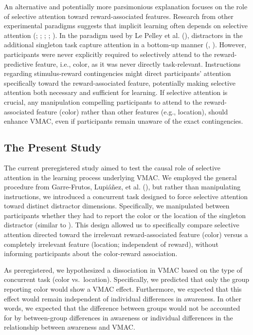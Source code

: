 \documentclass[
  man,
  floatsintext,
  longtable,
  nolmodern,
  notxfonts,
  notimes,
  colorlinks=true,linkcolor=blue,citecolor=blue,urlcolor=blue]{apa7}
\begin{document}
An alternative and potentially more parsimonious explanation focuses on
the role of selective attention toward reward-associated features.
Research from other experimental paradigms suggests that implicit
learning often depends on selective attention
(;
;
;
;
). In the paradigm used
by Le Pelley et al. (), distractors in
the additional singleton task capture attention in a bottom-up manner
(,
). However, participants were never
explicitly required to selectively attend to the reward-predictive
feature, i.e., color, as it was never directly task-relevant.
Instructions regarding stimulus-reward contingencies might direct
participants' attention specifically toward the reward-associated
feature, potentially making selective attention both necessary and
sufficient for learning. If selective attention is crucial, any
manipulation compelling participants to attend to the reward-associated
feature (color) rather than other features (e.g., location), should
enhance VMAC, even if participants remain unaware of the exact
contingencies.

\subsection{The Present Study}\label{the-present-study}

The current preregistered study aimed to test the causal role of
selective attention in the learning process underlying VMAC. We employed
the general procedure from Garre-Frutos, Lupiáñez, et al.
(), but rather than manipulating
instructions, we introduced a concurrent task designed to force
selective attention toward distinct distractor dimensions. Specifically,
we manipulated between participants whether they had to report the color
or the location of the singleton distractor (similar to
). This design allowed us
to specifically compare selective attention directed toward the
irrelevant reward-associated feature (color) versus a completely
irrelevant feature (location; independent of reward), without informing
participants about the color-reward association.

As preregistered, we hypothesized a dissociation in VMAC based on the
type of concurrent task (color vs.~location). Specifically, we predicted
that only the group reporting color would show a VMAC effect.
Furthermore, we expected that this effect would remain independent of
individual differences in awareness. In other words, we expected that
the difference between groups would not be accounted for by
between-group differences in awareness or individual differences in the
relationship between awareness and VMAC.
\end{document}
